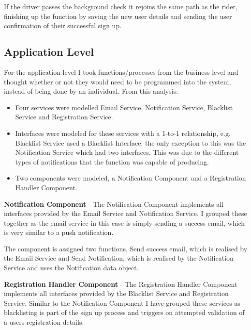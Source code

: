 \documentclass{article}
\begin{document}
    If the driver passes the background check it rejoins the same path as the rider, finishing up the function by saving the new user details and
    sending the user confirmation of their successful sign up.

    \newpage
    \subsection{Application Level}
    For the application level I took functions/processes from the business level and thought whether or not they would need to be 
    programmed into the system, instead of being done by an individual. From this analysis:

    \begin{itemize}
      \item Four services were modelled Email Service, Notification Service, Blacklist Service and Registration Service.
      \item Interfaces were modeled for these services with a 1-to-1 relationship, e.g. Blacklist Service used a Blacklist Interface.
            the only exception to this was the Notification Service which had two interfaces. This was due to the different types of
            notifications that the function was capable of producing.
      \item Two components were modeled, a Notification Component and a Registration Handler Component.
    \end{itemize}

    \textbf{Notification Component} - The Notification Component implements all interfaces provided by the Email Service and
    Notification Service. I grouped these together as the email service in this case is simply sending a success email, which
    is very similar to a push notification.

    The component is assigned two functions, Send success email, which is realised by the Email Service and Send Notification,
    which is realised by the Notification Service and uses the Notification data object.

    \vspace{0.1cm}
    \textbf{Registration Handler Component} - The Registration Handler Component implements all interfaces provided by the Blacklist
    Service and Registration Service. Similar to the Notification Component I have grouped these services as blacklisting is
    part of the sign up process and triggers on attempted validation of a users registration details.
\end{document}
